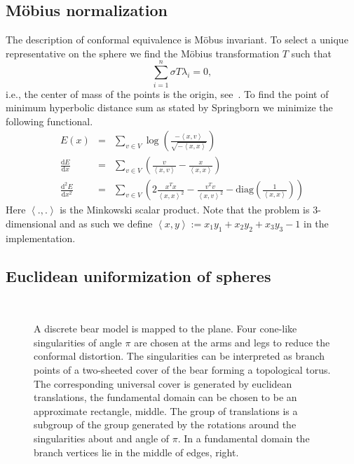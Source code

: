\documentclass[Thesis]{subfiles}
\begin{document}
\subsection{M{\"o}bius normalization}
\label{sec:moebius_normalization}
The description of conformal equivalence is M{\"o}bus invariant.  
To select a unique representative on the sphere we find the M{\"o}bius transformation $T$ such that
\[\sum_{i=1}^{n}\sigma T \lambda_i = 0,\]
i.e., the center of mass of the points is the origin, see~\cite{Springborn05}.
To find the point of minimum hyperbolic distance sum as stated by Springborn we minimize the following functional. 
\begin{eqnarray*} 
	E(x) &=& \sum_{v\in V}\log\left(\frac{-\left<x,v\right>}{\sqrt{-\left<x,x\right>}}\right)\\
	\frac{\mathrm d E}{\mathrm dx} &=& \sum_{v\in V}\left(\frac{v}{\left<x,v\right>} - \frac{x}{\left<x,x\right>}\right)\\
	\frac{\mathrm d^2 E}{\mathrm dx^2} &=& \sum_{v\in V}\left(2\frac{x^Tx}{\left<x,x\right>^2}-\frac{v^Tv}{\left<x,v\right>^2} - \mathrm{diag}\left(\frac{1}{\left<x,x\right>}\right)\right)
\end{eqnarray*}
Here $\left<.,.\right>$ is the Minkowski scalar product. Note that the problem is
 $3$-dimensional and as such we define $\left<x,y\right>:=x_1y_1+x_2y_2+x_3y_3-1$ in
the implementation.

\subsection{Euclidean uniformization of spheres}

\begin{figure}
\centering
{}\\
\caption{
A discrete bear model is mapped to the plane.
Four cone-like singularities of angle $\pi$ are chosen at the arms and legs to reduce the conformal distortion.
The singularities can be interpreted as branch points of a two-sheeted cover of the bear forming a topological torus.
The corresponding universal cover is generated by euclidean translations, the fundamental domain can be chosen to be an approximate rectangle, middle.
The group of translations is a subgroup of the group generated by the rotations around the singularities about and angle of $\pi$. In a fundamental domain the branch vertices lie in the middle of edges, right.
}
\label{fig:bear}
\end{figure}
\end{document}
